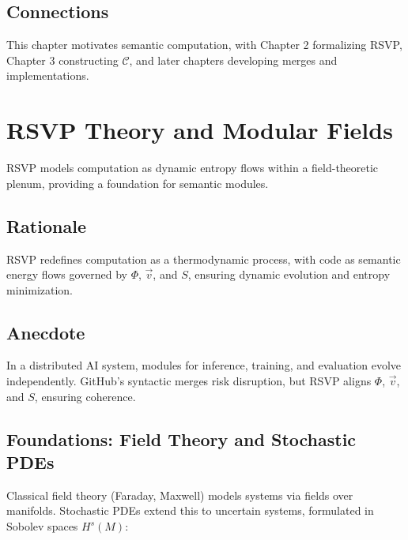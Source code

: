 \documentclass[12pt]{article}
\begin{document}
\subsection{Connections}
This chapter motivates semantic computation, with Chapter 2 formalizing RSVP, Chapter 3 constructing $\mathcal{C}$, and later chapters developing merges and implementations.

\begin{center}
\end{center}

\section{RSVP Theory and Modular Fields}
\label{sec:chapter2}

RSVP models computation as dynamic entropy flows within a field-theoretic plenum, providing a foundation for semantic modules.

\subsection{Rationale}
RSVP redefines computation as a thermodynamic process, with code as semantic energy flows governed by $\Phi$, $\vec{v}$, and $S$, ensuring dynamic evolution and entropy minimization.

\subsection{Anecdote}
In a distributed AI system, modules for inference, training, and evaluation evolve independently. GitHub’s syntactic merges risk disruption, but RSVP aligns $\Phi$, $\vec{v}$, and $S$, ensuring coherence.

\subsection{Foundations: Field Theory and Stochastic PDEs}
Classical field theory (Faraday, Maxwell) models systems via fields over manifolds. Stochastic PDEs \cite{daprato2014stochastic} extend this to uncertain systems, formulated in Sobolev spaces $H^s(M)$:
\end{document}
